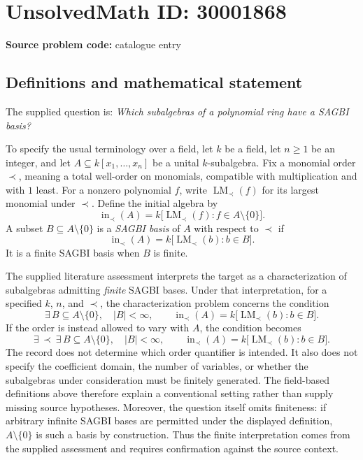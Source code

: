 \documentclass[11pt]{article}
\begin{document}
\section*{UnsolvedMath ID: 30001868}
\textbf{Source problem code:} catalogue entry
\subsection{Definitions and mathematical statement}
The supplied question is: \emph{Which subalgebras of a polynomial ring have a SAGBI basis?}

To specify the usual terminology over a field, let \(k\) be a field, let \(n\geq 1\) be an integer, and let \(A\subseteq k[x_1,\ldots,x_n]\) be a unital \(k\)-subalgebra. Fix a monomial order \(\prec\), meaning a total well-order on monomials, compatible with multiplication and with \(1\) least. For a nonzero polynomial \(f\), write \(\operatorname{LM}_{\prec}(f)\) for its largest monomial under \(\prec\). Define the initial algebra by
\[
\operatorname{in}_{\prec}(A)
 = k\bigl[\operatorname{LM}_{\prec}(f):f\in A\setminus\{0\}\bigr].
\]
A subset \(B\subseteq A\setminus\{0\}\) is a \emph{SAGBI basis} of \(A\) with respect to \(\prec\) if
\[
\operatorname{in}_{\prec}(A)
 = k\bigl[\operatorname{LM}_{\prec}(b):b\in B\bigr].
\]
It is a finite SAGBI basis when \(B\) is finite.

The supplied literature assessment interprets the target as a characterization of subalgebras admitting \emph{finite} SAGBI bases. Under that interpretation, for a specified \(k\), \(n\), and \(\prec\), the characterization problem concerns the condition
\[
\exists\,B\subseteq A\setminus\{0\},\quad |B|<\infty,
\qquad
\operatorname{in}_{\prec}(A)
 =k\bigl[\operatorname{LM}_{\prec}(b):b\in B\bigr].
\]
If the order is instead allowed to vary with \(A\), the condition becomes
\[
\exists\,\prec\ \exists\,B\subseteq A\setminus\{0\},\quad |B|<\infty,
\qquad
\operatorname{in}_{\prec}(A)
 =k\bigl[\operatorname{LM}_{\prec}(b):b\in B\bigr].
\]
The record does not determine which order quantifier is intended. It also does not specify the coefficient domain, the number of variables, or whether the subalgebras under consideration must be finitely generated. The field-based definitions above therefore explain a conventional setting rather than supply missing source hypotheses. Moreover, the question itself omits finiteness: if arbitrary infinite SAGBI bases are permitted under the displayed definition, \(A\setminus\{0\}\) is such a basis by construction. Thus the finite interpretation comes from the supplied assessment and requires confirmation against the source context.
\end{document}
